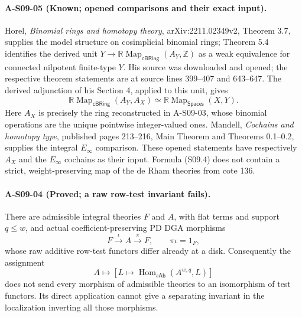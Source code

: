 \paragraph{A-S09-05 (Known; opened comparisons and their exact input).}
Horel, \emph{Binomial rings and homotopy theory}, arXiv:2211.02349v2,
Theorem 3.7, supplies the model structure on cosimplicial binomial rings;
Theorem 5.4 identifies the derived unit
$Y\to\mathbb R\operatorname{Map}_{\mathsf{cBRing}}(A_Y,\mathbb Z)$
as a weak equivalence for connected nilpotent finite-type $Y$.
His source was downloaded and opened; the respective theorem statements
are at source lines 399--407 and 643--647.  The derived adjunction of
his Section 4, applied to this unit, gives
\[
 \mathbb R\operatorname{Map}_{\mathsf{cBRing}}(A_Y,A_X)
 \simeq\mathbb R\operatorname{Map}_{\mathsf{Spaces}}(X,Y).
 \tag{S09.4}
\]
Here $A_X$ is precisely the ring reconstructed in A-S09-03, whose
binomial operations are the unique pointwise integer-valued ones.
Mandell, \emph{Cochains and homotopy type}, published pages 213--216,
Main Theorem and Theorems 0.1--0.2, supplies the integral
$E_\infty$ comparison.  These opened statements have respectively
$A_X$ and the $E_\infty$ cochains as their input.  Formula (S09.4)
does not contain a strict, weight-preserving map of the de Rham
theories from cote 136.

\paragraph{A-S09-04 (Proved; a raw row-test invariant fails).}
There are admissible integral theories $F$ and $A$, with flat terms
and support $q\leq w$, and actual coefficient-preserving PD DGA
morphisms
\[
 F\xrightarrow{\iota}A\xrightarrow{\pi}F,
 \qquad\pi\iota=1_F,
 \tag{S09.5}
\]
whose raw additive row-test functors differ already at a disk.
Consequently the assignment
\[
 A\longmapsto\left[
 L\longmapsto\operatorname{Hom}_{s\mathsf{Ab}}(A^{w,q},L)
 \right]
 \tag{S09.6}
\]
does not send every morphism of admissible theories to an isomorphism
of test functors.  Its direct application cannot give a separating
invariant in the localization inverting all those morphisms.

